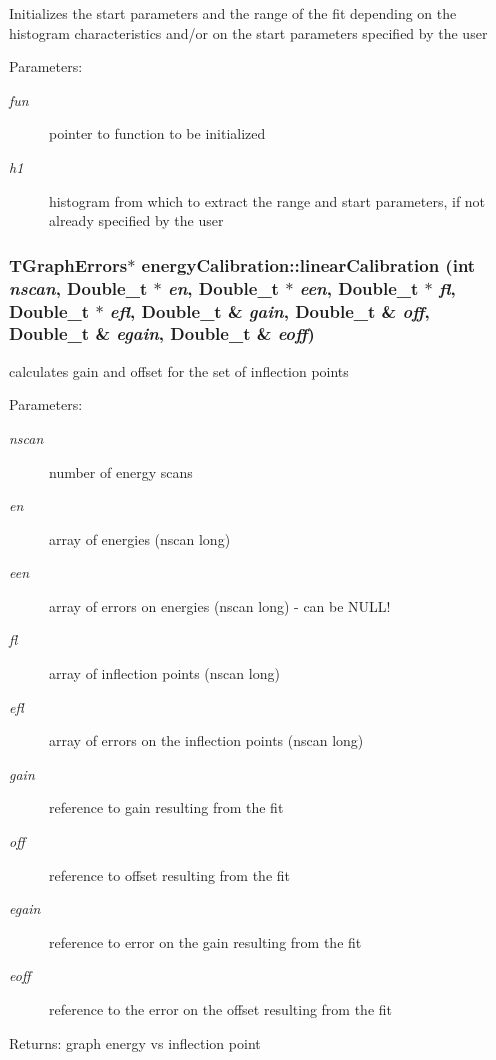 Initializes the start parameters and the range of the fit depending on the histogram characteristics and/or on the start parameters specified by the user \begin{Desc}
\item[Parameters:]
\begin{description}
\item[{\em fun}]pointer to function to be initialized \item[{\em h1}]histogram from which to extract the range and start parameters, if not already specified by the user \end{description}
\end{Desc}
\subsubsection{\setlength{\rightskip}{0pt plus 5cm}TGraph\-Errors$\ast$ energy\-Calibration::linear\-Calibration (int {\em nscan}, Double\_\-t $\ast$ {\em en}, Double\_\-t $\ast$ {\em een}, Double\_\-t $\ast$ {\em fl}, Double\_\-t $\ast$ {\em efl}, Double\_\-t \& {\em gain}, Double\_\-t \& {\em off}, Double\_\-t \& {\em egain}, Double\_\-t \& {\em eoff})}\label{classenergyCalibration_c7f46f2d051f28211681e851f99d3fc4}


calculates gain and offset for the set of inflection points \begin{Desc}
\item[Parameters:]
\begin{description}
\item[{\em nscan}]number of energy scans \item[{\em en}]array of energies (nscan long) \item[{\em een}]array of errors on energies (nscan long) - can be NULL! \item[{\em fl}]array of inflection points (nscan long) \item[{\em efl}]array of errors on the inflection points (nscan long) \item[{\em gain}]reference to gain resulting from the fit \item[{\em off}]reference to offset resulting from the fit \item[{\em egain}]reference to error on the gain resulting from the fit \item[{\em eoff}]reference to the error on the offset resulting from the fit \end{description}
\end{Desc}
\begin{Desc}
\item[Returns:]graph energy vs inflection point \end{Desc}
